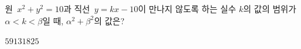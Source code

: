 원~$x^2+y^2=10$과 직선~$y=kx-10$이 만나지 않도록 하는 실수 $k$의 값의 범위가 $\alpha<k<\beta$일 때, $\alpha^2+\beta^2$의 값은?
\begin{choices32}{$5$}{$9$}{$13$}{$18$}{$25$}\end{choices32}
